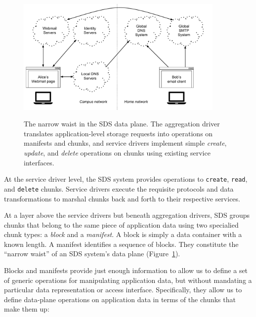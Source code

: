\begin{figure}[h]
   \caption{The narrow waist in the SDS data plane.  The aggregation driver
   translates application-level storage requests into operations on manifests
   and chunks, and service drivers implement simple \textit{create},
   \textit{update}, and \textit{delete} operations on chunks using existing
   service interfaces.}
   \centering
   \includegraphics[width=0.9\textwidth,page=4]{figures/dissertation-figures}
   \label{fig:chap2-narrow-waist}
\end{figure}

At the service driver level, the SDS
system provides operations to \texttt{create}, \texttt{read}, and
\texttt{delete} chunks.  Service drivers execute the requisite protocols
and data transformations to
marshal chunks back and forth to their respective services.

At a layer above the service drivers but beneath aggregation drivers, SDS
groups chunks that belong to the same piece of application data using two specialied
chunk types:  a \emph{block} and a \emph{manifest}.  A block is simply a data
container with a known length.  A manifest identifies a sequence of blocks.
They constitute the ``narrow waist'' of an SDS system's data plane
(Figure~\ref{fig:chap2-narrow-waist}).

Blocks and manifests provide just enough information to allow us to define a
set of generic operations for manipulating application data, but
without mandating a particular data representation or access interface.
Specifically, they allow us to define data-plane operations on
application data in terms of the chunks that make them up:

